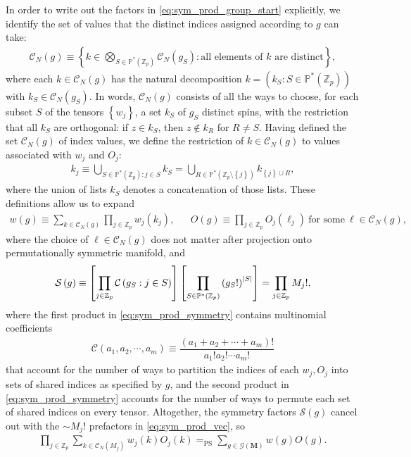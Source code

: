 \documentclass[nofootinbib,notitlepage,11pt]{revtex4-2}
\renewcommand{\t}{\text} %
\newcommand{\f}[2]{\dfrac{#1}{#2}} %
\newcommand{\p}[1]{\left(#1\right)} %
\renewcommand{\sp}[1]{\left[#1\right]} %
\renewcommand{\set}[1]{\left\{#1\right\}} %
\newcommand{\m}{\bm} %
\newcommand{\1}{\mathds{1}}
\newcommand{\C}{\mathcal{C}}
\newcommand{\G}{\mathcal{G}}
\renewcommand{\S}{\mathcal{S}}
\newcommand{\PP}{\mathbb{P}}
\newcommand{\ZZ}{\mathbb{Z}}
\newcommand{\EQPS}{=_{\text{PS}}}
\begin{document}
In order to write out the factors in \eqref{eq:sym_prod_group_start}
explicitly, we identify the set of values that the distinct indices
assigned according to $g$ can take:
\begin{align}
  \C_N\p{g}
  \equiv \set{ k \in \bigotimes_{S\in\PP^*\p{\ZZ_p}} \C_N\p{g_S}
    : \t{all elements of $k$ are distinct} },
  \label{eq:index_values}
\end{align}
where each $k\in\C_N\p{g}$ has the natural decomposition
$k=\p{k_S:S\in\PP^*\p{\ZZ_p}}$ with $k_S\in\C_N\p{g_S}$.  In words,
$\C_N\p{g}$ consists of all the ways to choose, for each subset $S$ of
the tensors $\set{w_j}$, a set $k_S$ of $g_S$ distinct spins, with the
restriction that all $k_S$ are orthogonal: if $z\in k_S$, then
$z\notin k_R$ for $R\ne S$.  Having defined the set $\C_N\p{g}$ of
index values, we define the restriction of $k\in\C_N\p{g}$ to values
associated with $w_j$ and $O_j$:
\begin{align}
  k_j \equiv \bigcup_{S\in\PP^*\p{\ZZ_p} : j\in S} k_S
  = \bigcup_{R\in\PP^*\p{\ZZ_p\setminus\set{j}}} k_{\set{j}\cup R},
\end{align}
where the union of lists $k_S$ denotes a concatenation of those lists.
These definitions allow us to expand
\begin{align}
  w\p{g} \equiv \sum_{k\in\C_N\p{g}} \prod_{j\in\ZZ_p} w_j\p{k_j},
  &&
  O\p{g} \equiv \prod_{j\in\ZZ_p}
  O_j\p{\ell_j}~\t{for some}~\ell\in\C_N\p{g},
  \label{eq:diagram_factors}
\end{align}
where the choice of $\ell\in\C_N\p{g}$ does not matter after
projection onto permutationally symmetric manifold, and
\begin{align}
  \S\p{g} \equiv \sp{\prod_{j\in\ZZ_p} \C\p{ g_S : j\in S }}
  \sp{\prod_{S\in\PP^*\p{\ZZ_p}} \p{g_S!}^\abs{S}}
  = \prod_{j\in\ZZ_p} M_j!,
  \label{eq:sym_prod_symmetry}
\end{align}
where the first product in \eqref{eq:sym_prod_symmetry} contains
multinomial coefficients
\begin{align}
  \C\p{a_1,a_2,\cdots,a_m}
  \equiv \f{\p{a_1+a_2+\cdots+a_m}!}{a_1!a_2!\cdots a_m!}
\end{align}
that account for the number of ways to partition the indices of each
$w_j,O_j$ into sets of shared indices as specified by $g$, and the
second product in \eqref{eq:sym_prod_symmetry} accounts for the number
of ways to permute each set of shared indices on every tensor.
Altogether, the symmetry factors $\S\p{g}$ cancel out with the
$\sim M_j!$ prefactors in \eqref{eq:sym_prod_vec}, so
\begin{align}
  \prod_{j\in\ZZ_p} \sum_{k\in\C_N\p{M_j}} w_j\p{k} O_j\p{k}
  \EQPS \sum_{g\in\G\p{\m M}} w\p{g} O\p{g}.
  \label{eq:sym_prod_group}
\end{align}
\end{document}
